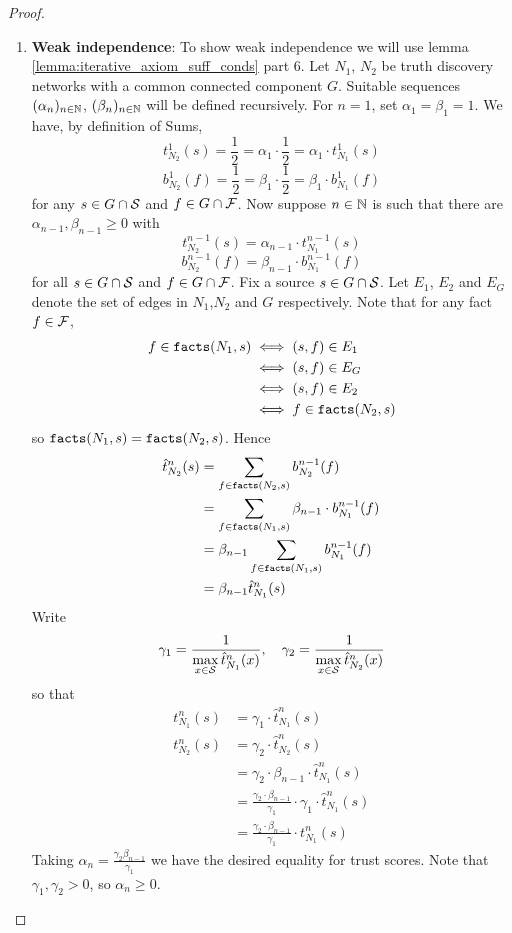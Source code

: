 \documentclass[../main.tex]{subfiles}
\begin{document}
\begin{proof}
\begin{enumerate}
\item\textbf{Weak independence}: To show weak independence we will use lemma
\ref{lemma:iterative_axiom_suff_conds} part 6. Let $N_1$, $N_2$ be
truth discovery networks with a common connected component $G$. Suitable
sequences $(\alpha_n)_{n \in \Nat}$, $(\beta_n)_{n \in \Nat}$ will be defined
recursively. For $n = 1$, set $\alpha_1 = \beta_1 = 1$. We have, by definition
of Sums,
\[
    t_{N_2}^1(s) = \frac{1}{2}
                 = \alpha_1 \cdot \frac{1}{2}
                 = \alpha_1 \cdot t_{N_1}^1(s)
\]
\[
    b_{N_2}^1(f) = \frac{1}{2}
                 = \beta_1 \cdot \frac{1}{2}
                 = \beta_1 \cdot b_{N_1}^1(f)
\]
for any $s \in G \cap \S$ and $f \in G \cap \F$. Now suppose $n \in \Nat$ is
such that there are $\alpha_{n - 1}, \beta_{n - 1}
\ge 0$ with
\[
    t_{N_2}^{n - 1}(s) = \alpha_{n - 1} \cdot t_{N_1}^{n - 1}(s)
\]
\[
    b_{N_2}^{n - 1}(f) = \beta_{n - 1} \cdot b_{N_1}^{n - 1}(f)
\]
for all $s \in G \cap \S$ and $f \in G \cap \F$. Fix a source $s \in G \cap
\S$. Let $E_1$, $E_2$ and $E_G$ denote the set of edges in $N_1$,$N_2$ and $G$
respectively. Note that for any fact $f \in \F$,
\begin{align*}
    f \in \fact(N_1, s) & \iff (s, f) \in E_1 \\
                        & \iff (s, f) \in E_G \\
                        & \iff (s, f) \in E_2 \\
                        & \iff f \in \fact(N_2, s)
\end{align*}
so $\fact(N_1, s) = \fact(N_2, s)$. Hence
\begin{align*}
    \hat{t}_{N_2}^n(s) & = \sum_{f \in \fact(N_2, s)}{b_{N_2}^{n - 1}(f)} \\
                       & = \sum_{f \in \fact(N_1, s)}{\beta_{n - 1} \cdot b_{N_1}^{n - 1}(f)} \\
                       & = \beta_{n - 1}\sum_{f \in \fact(N_1, s)}{b_{N_1}^{n - 1}(f)} \\
                       & = \beta_{n - 1}\hat{t}_{N_1}^n(s)
\end{align*}
Write
\[
    \gamma_1 = \frac{1}{\max\limits_{x \in \S}{\hat{t}_{N_1}^n(x)}},
    \quad
    \gamma_2 = \frac{1}{\max\limits_{x \in \S}{\hat{t}_{N_2}^n(x)}}
\]
so that
\begin{align*}
    t_{N_1}^n(s) & = \gamma_1 \cdot \hat{t}_{N_1}^n(s) \\
    t_{N_2}^n(s) & = \gamma_2 \cdot \hat{t}_{N_2}^n(s) \\
     & = \gamma_2 \cdot \beta_{n - 1} \cdot \hat{t}_{N_1}^n(s) \\
     & = \frac{\gamma_2 \cdot \beta_{n - 1}}{\gamma_1} \cdot \gamma_1 \cdot \hat{t}_{N_1}^n(s) \\
     & = \frac{\gamma_2 \cdot \beta_{n - 1}}{\gamma_1} \cdot t_{N_1}^n(s)
\end{align*}
Taking $\alpha_n = \frac{\gamma_2\beta_{n-1}}{\gamma_1}$ we have the desired
equality for trust scores. Note that $\gamma_1, \gamma_2 > 0$, so $\alpha_n \ge
0$.


\end{enumerate}
\end{proof}
\end{document}
